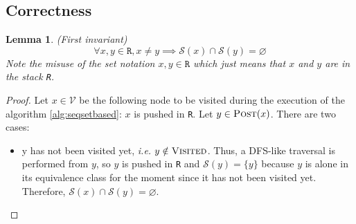 \documentclass[a4 paper, 12pt]{article}
\newtheorem{lemma}{Lemma}
\begin{document}
\subsection{Correctness}
\begin{lemma}(First invariant)\label{lemma:disjointness}
    \begin{equation*}
        \forall x, y \in \texttt{R}, x\neq y \implies \mathcal{S}(x) \cap \mathcal{S}(y) = \varnothing
    \end{equation*}
    Note the misuse of the set notation $x, y \in \texttt{R}$ which just means that $x$ and $y$ are in the stack \texttt{R}.
\end{lemma}

\begin{proof}
    Let $x \in \mathcal{V}$ be the following node to be visited during the execution of the algorithm \ref{alg:seqsetbased}: $x$ is pushed in \texttt{R}. Let $y \in \textsc{Post}(x)$. There are two cases:\\
    \begin{itemize}
        \item y has not been visited yet, \textit{i.e.} $y \notin \textsc{Visited}$. Thus, a DFS-like traversal is performed from $y$, so $y$ is pushed in \texttt{R} and $\mathcal{S}(y) = \{y\}$ because $y$ is alone in its equivalence class for the moment since it has not been visited yet.\\
        Therefore, $\mathcal{S}(x) \cap \mathcal{S}(y) = \varnothing$.


\end{itemize}
\end{proof}
\end{document}
